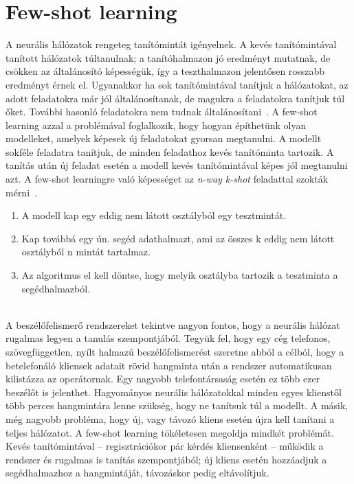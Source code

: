 \section{Few-shot learning}

A neurális hálózatok rengeteg
tanítómintát igényelnek. A kevés tanítómintával
tanított hálózatok túltanulnak; a tanítóhalmazon jó eredményt mutatnak, de csökken az általánosító képességük, így a teszthalmazon jelentősen rosszabb eredményt érnek el. Ugyanakkor ha sok tanítómintával tanítjuk a hálózatokat, az adott feladatokra már jól általánosítanak, de magukra a feladatokra tanítjuk túl őket. További hasonló feladatokra nem tudnak általánosítani~\cite{RL_meta_learning}.
\newline
\newline
A few-shot learning azzal a problémával foglalkozik, hogy hogyan építhetünk olyan modelleket, amelyek képesek új feladatokat gyorsan megtanulni. A
modellt sokféle feladatra tanítjuk, de minden feladathoz kevés tanítóminta tartozik. A tanítás után új feladat esetén a modell kevés tanítómintával képes jól megtanulni azt. 
\newline
\newline
A few-shot learningre való képességet az \emph{n-way k-shot} feladattal szokták mérni~\cite{voicemap_medium}. 

\begin{enumerate}
	\item A modell kap egy eddig nem látott osztályból egy tesztmintát.
	\item Kap továbbá egy ún. segéd adathalmazt, ami az összes k eddig nem látott osztályból n mintát tartalmaz.
	\item Az algoritmus el kell döntse, hogy melyik osztályba tartozik a tesztminta a segédhalmazból.
\end{enumerate}
\ \\
A beszélőfelismerő rendszereket tekintve nagyon fontos, hogy a neurális hálózat rugalmas legyen a tanulás szempontjából. Tegyük fel, hogy egy cég telefonos, szövegfüggetlen,
nyílt halmazú beszélőfelismerést szeretne abból a célból, hogy a betelefonáló kliensek adatait rövid hangminta után a rendszer automatikusan kilistázza az operátornak.
Egy nagyobb telefontársaság esetén ez több ezer beszélőt is jelenthet. Hagyományos neurális hálózatokkal minden egyes klienstől több perces hangmintára lenne szükség,
hogy ne tanítsuk túl a modellt. 
\newline
\newline
A másik, még nagyobb probléma, hogy új, vagy távozó kliens esetén újra kell tanítani a teljes hálózatot. A few-shot learning tökéletesen
megoldja mindkét problémát. Kevés tanítómintával -- regisztrációkor pár kérdés kliensenként -- működik a rendszer és rugalmas is tanítás szempontjából; új kliens esetén
hozzáadjuk a segédhalmazhoz a hangmintáját, távozáskor pedig eltávolítjuk.

